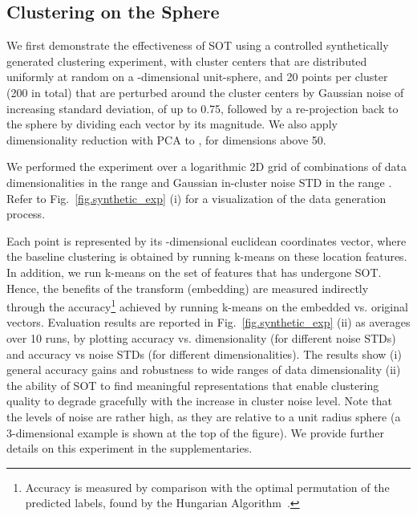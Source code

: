 \subsection{Clustering on the Sphere}
We first demonstrate the effectiveness of SOT using a controlled synthetically generated clustering experiment, with  cluster centers that are distributed uniformly at random on a -dimensional unit-sphere, and 20  points per cluster (200 in total) that are perturbed around the cluster centers by Gaussian noise of increasing standard deviation, of up to 0.75, followed by a re-projection back to the sphere by dividing each vector by its  magnitude. We also apply dimensionality reduction with PCA to , for dimensions above 50.

We performed the experiment over a logarithmic 2D grid of combinations of data dimensionalities  in the range  and Gaussian in-cluster noise STD in the range . Refer to Fig.~\ref{fig.synthetic_exp} (i) for a visualization of the data generation process. 

Each point is represented by its -dimensional euclidean coordinates vector, where the baseline clustering is obtained by running k-means on these location features. In addition, we run k-means on the set of features that has undergone SOT. Hence, the benefits of the transform (embedding) are measured indirectly through the accuracy\footnote{Accuracy is measured by comparison with the optimal permutation of the predicted labels, found by the Hungarian Algorithm~\cite{kuhn1955hungarian}.} achieved by running k-means on the embedded vs. original vectors.
Evaluation results are reported in Fig.~\ref{fig.synthetic_exp} (ii) as averages over 10 runs, by plotting accuracy vs. dimensionality (for different noise STDs) and accuracy vs noise STDs (for different dimensionalities). The results show (i) general accuracy gains and robustness to wide ranges of data dimensionality (ii) the ability of SOT to find meaningful representations that enable clustering quality to degrade gracefully with the increase in cluster noise level. Note that the levels of noise are rather high, as they are relative to a unit radius sphere (a 3-dimensional example is shown at the top of the figure). We provide further details on this experiment in the supplementaries.

